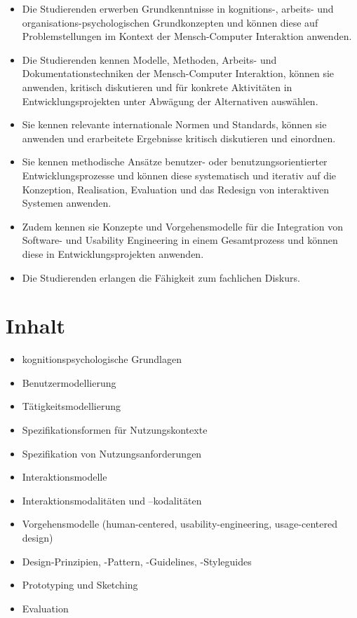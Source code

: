 \begin{itemize}
\tightlist
\item
  Die Studierenden erwerben Grundkenntnisse in kognitions-, arbeits- und
  organisations-psychologischen Grundkonzepten und können diese auf
  Problemstellungen im Kontext der Mensch-Computer Interaktion anwenden.
\item
  Die Studierenden kennen Modelle, Methoden, Arbeits- und
  Dokumentationstechniken der Mensch-Computer Interaktion, können sie
  anwenden, kritisch diskutieren und für konkrete Aktivitäten in
  Entwicklungsprojekten unter Abwägung der Alternativen auswählen.
\item
  Sie kennen relevante internationale Normen und Standards, können sie
  anwenden und erarbeitete Ergebnisse kritisch diskutieren und
  einordnen.
\item
  Sie kennen methodische Ansätze benutzer- oder benutzungsorientierter
  Entwicklungsprozesse und können diese systematisch und iterativ auf
  die Konzeption, Realisation, Evaluation und das Redesign von
  interaktiven Systemen anwenden.
\item
  Zudem kennen sie Konzepte und Vorgehensmodelle für die Integration von
  Software- und Usability Engineering in einem Gesamtprozess und können
  diese in Entwicklungsprojekten anwenden.
\item
  Die Studierenden erlangen die Fähigkeit zum fachlichen Diskurs.
\end{itemize}

\hypertarget{inhaltpathlabel....srcmodulbeschreibungen-bachelor-bpo5ba_mensch-computer_interaktion}{%
\section*{Inhalt\label{../../src/modulbeschreibungen-bachelor-bpo5/BA_Mensch-Computer_Interaktion}}\label{inhaltpathlabel....srcmodulbeschreibungen-bachelor-bpo5ba_mensch-computer_interaktion}}

\begin{itemize}
\tightlist
\item
  kognitionspsychologische Grundlagen
\item
  Benutzermodellierung
\item
  Tätigkeitsmodellierung
\item
  Spezifikationsformen für Nutzungskontexte
\item
  Spezifikation von Nutzungsanforderungen
\item
  Interaktionsmodelle
\item
  Interaktionsmodalitäten und --kodalitäten
\item
  Vorgehensmodelle (human-centered, usability-engineering,
  usage-centered design)
\item
  Design-Prinzipien, -Pattern, -Guidelines, -Styleguides
\item
  Prototyping und Sketching
\item
  Evaluation
\end{itemize}

